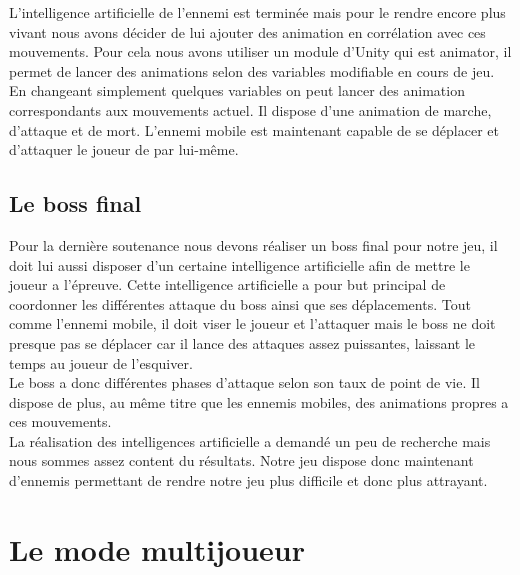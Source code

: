 \documentclass[12pt]{article}
\begin{document}
L'intelligence artificielle de l'ennemi est terminée mais pour le rendre encore plus vivant nous avons décider de lui ajouter des animation en corrélation avec ces mouvements. Pour cela nous avons utiliser un module d'Unity qui est \gls{animator}, il permet de lancer des animations selon des variables modifiable en cours de jeu.\\
En changeant simplement quelques variables on peut lancer des animation correspondants aux mouvements actuel. Il dispose d'une animation de marche, d'attaque et de mort. L'ennemi mobile est maintenant capable de se déplacer et d'attaquer le joueur de par lui-même.

\subsection{Le boss final}

Pour la dernière soutenance nous devons réaliser un boss final pour notre jeu, il doit lui aussi disposer d'un certaine intelligence artificielle afin de mettre le joueur a l'épreuve. Cette intelligence artificielle a pour but principal de coordonner les différentes attaque du boss ainsi que ses déplacements. Tout comme l'ennemi mobile, il doit viser le joueur et l'attaquer mais le boss ne doit presque pas se déplacer car il lance des attaques assez puissantes, laissant le temps au joueur de l'esquiver.\\
Le boss a donc différentes phases d'attaque selon son taux de point de vie. Il dispose de plus, au même titre que les ennemis mobiles, des animations propres a ces mouvements.\\

La réalisation des intelligences artificielle a demandé un peu de recherche mais nous sommes assez content du résultats. Notre jeu dispose donc maintenant d'ennemis permettant de rendre notre jeu plus difficile et donc plus attrayant.

\section{Le mode multijoueur}
\end{document}
